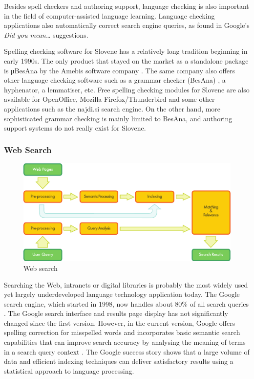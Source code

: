 \begin{multicols}{2}

Besides spell checkers and authoring support, language checking is also important in the field of computer-assisted language learning. Language checking applications also automatically correct search engine queries, as found in Google's \textit{Did you mean…} suggestions.

Spelling checking software for Slovene has a relatively long tradition beginning in early 1990s. The only product that stayed on the market as a standalone package is μBesAna by the Amebis software company \cite{Amb1}. The same company also offers other language checking software such as a grammar checker (BesAna) \cite{Amb2}, a hyphenator, a lemmatiser, etc. Free spelling checking modules for Slovene are also available for OpenOffice, Mozilla Firefox/Thunderbird and some other applications such as the najdi.si search engine. On the other hand, more sophisticated grammar checking is mainly limited to BesAna, and authoring support systems do not really exist for Slovene.

\subsubsection{Web Search}

\begin{figure}[htb]
  \center
  \includegraphics[width=\textwidth]{../_media/english/web_search_architecture}
  \caption{Web search}
  \label{fig:websearcharch_en}
 \end{figure}

Searching the Web, intranets or digital libraries is probably the most widely used yet largely underdeveloped language technology application today. The Google search engine, which started in 1998, now handles about 80\% of all search queries \cite{spi1}. The Google search interface and results page display has not significantly changed since the first version. However, in the current version, Google offers spelling correction for misspelled words and incorporates basic semantic search capabilities that can improve search accuracy by analysing the meaning of terms in a search query context \cite{pc1}. The Google success story shows that a large volume of data and efficient indexing techniques can deliver satisfactory results using a statistical approach to language processing. 


\end{multicols}
